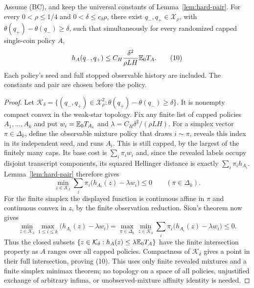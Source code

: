 \begin{lemma}\label{lem:universal-pair}
Assume (BC), and keep the universal constants of
Lemma~\ref{lem:hard-pair}. For every $0<\rho\le1/4$ and
$0<\delta\le c_\delta\rho$, there exist
$q_-,q_+\in\mathcal X_\rho$, with
$\theta(q_+)-\theta(q_-)\ge\delta$, such that simultaneously for every
randomized capped single-coin policy $A$,
\[
 h_A(q_-,q_+)\le C_H\frac{\delta^2}{\rho LH}\mathbb E_0T_A.       \tag{10}
\]
Each policy's seed and full stopped observable history are included.
The constants and pair are chosen before the policy.
\end{lemma}
\begin{proof}
Let $\mathcal K_\delta=\{(q_-,q_+)\in\mathcal X_\rho^2:
\theta(q_+)-\theta(q_-)\ge\delta\}$. It is nonempty compact convex in
the weak-star topology. Fix any finite list of capped policies
$A_1,\ldots,A_k$ and put $w_i=\mathbb E_0T_{A_i}$ and
$\lambda=C_H\delta^2/(\rho LH)$. For a simplex vector
$\pi\in\Delta_k$, define the observable mixture policy that draws
$i\sim\pi$, reveals this index in its independent seed, and runs $A_i$.
This is still capped, by the largest of the finitely many caps. Its
base cost is $\sum_i\pi_iw_i$ and, since the revealed labels occupy
disjoint transcript components, its squared Hellinger distance is exactly
$\sum_i\pi_i h_{A_i}$. Lemma~\ref{lem:hard-pair} therefore gives
\[
 \min_{z\in\mathcal K_\delta}
       \sum_i\pi_i\big(h_{A_i}(z)-\lambda w_i\big)\le0
       \qquad(\pi\in\Delta_k).
\]
For the finite simplex the displayed function is continuous affine in
$\pi$ and continuous convex in $z$, by the finite observation reduction.
Sion's theorem now gives
\[
 \min_{z\in\mathcal K_\delta}
       \max_{1\le i\le k}\big(h_{A_i}(z)-\lambda w_i\big)
   =\max_{\pi\in\Delta_k}\min_{z\in\mathcal K_\delta}
       \sum_i\pi_i\big(h_{A_i}(z)-\lambda w_i\big)\le0.
\]
Thus the closed subsets
$\{z\in\mathcal K_\delta:h_A(z)\le\lambda\mathbb E_0T_A\}$
have the finite intersection property as $A$ ranges over all capped
policies. Compactness of $\mathcal K_\delta$ gives a point in their full
intersection, proving (10). This uses only finite revealed mixtures and
a finite simplex minimax theorem; no topology on a space of all policies,
unjustified exchange of arbitrary infima, or unobserved-mixture affinity
identity is needed.
\end{proof}

